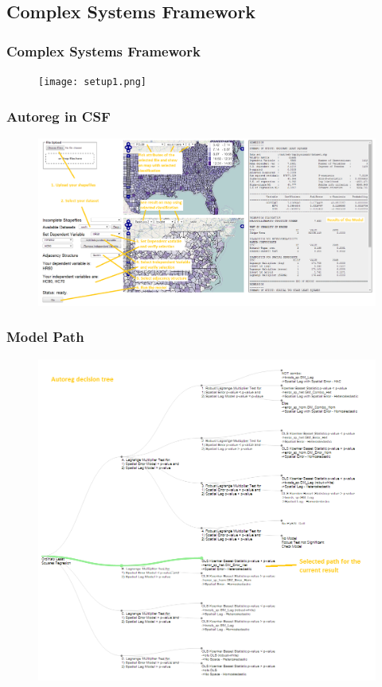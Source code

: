\documentclass[usepdftitle=false,professionalfonts,compress ]{beamer}
\begin{document}
\subsection{Complex Systems Framework}


{
\begin{frame}\frametitle{Complex Systems Framework}

\begin{figure}
	\texttt{[image: setup1.png]}\end{figure}
\end{frame}
}



{
\begin{frame}\frametitle{Autoreg in CSF}

\begin{figure}
	\includegraphics[width=.97\textwidth]{autoreg.png}\end{figure}
\end{frame}
}



{
\begin{frame}\frametitle{Model Path}

\begin{figure}
	\includegraphics[height=.97\textheight]{tree.png}\end{figure}
\end{frame}
}
\end{document}
